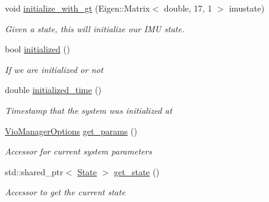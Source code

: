 \begin{DoxyCompactItemize}
void \hyperlink{classov__msckf_1_1VioManager_a196e1780d418021e2c41a394747e872b}{initialize\+\_\+with\+\_\+gt} (Eigen\+::\+Matrix$<$ double, 17, 1 $>$ imustate)
\begin{DoxyCompactList}\small\item\em Given a state, this will initialize our I\+MU state. \end{DoxyCompactList}\item 
\mbox{\label{classov__msckf_1_1VioManager_ae463166d4a27c3576fab416751bea40f}} 
bool \hyperlink{classov__msckf_1_1VioManager_ae463166d4a27c3576fab416751bea40f}{initialized} ()
\begin{DoxyCompactList}\small\item\em If we are initialized or not \end{DoxyCompactList}\item 
\mbox{\label{classov__msckf_1_1VioManager_a12069947bc27ee0595978f2d188551bc}} 
double \hyperlink{classov__msckf_1_1VioManager_a12069947bc27ee0595978f2d188551bc}{initialized\+\_\+time} ()
\begin{DoxyCompactList}\small\item\em Timestamp that the system was initialized at \end{DoxyCompactList}\item 
\mbox{\label{classov__msckf_1_1VioManager_addbe77f2b0c6554b9f1baa5071b8c6d2}} 
\hyperlink{structov__msckf_1_1VioManagerOptions}{Vio\+Manager\+Options} \hyperlink{classov__msckf_1_1VioManager_addbe77f2b0c6554b9f1baa5071b8c6d2}{get\+\_\+params} ()
\begin{DoxyCompactList}\small\item\em Accessor for current system parameters \end{DoxyCompactList}\item 
\mbox{\label{classov__msckf_1_1VioManager_abcdebe3b9debe73fb6a11b1c3b899eb1}} 
std\+::shared\+\_\+ptr$<$ \hyperlink{classov__msckf_1_1State}{State} $>$ \hyperlink{classov__msckf_1_1VioManager_abcdebe3b9debe73fb6a11b1c3b899eb1}{get\+\_\+state} ()
\begin{DoxyCompactList}\small\item\em Accessor to get the current state \end{DoxyCompactList}\item 

\end{DoxyCompactItemize}

